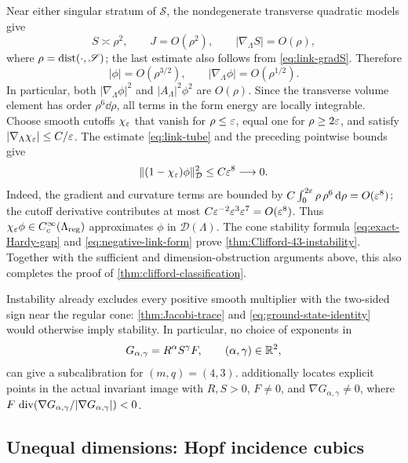 Near either singular stratum of $\mathscr S$, the nondegenerate transverse
quadratic models give
\[
 S\asymp\rho^2,
 \qquad
 J=O(\rho^2),
 \qquad
 |\nabla_\Lambda S|=O(\rho),
\]
where $\rho=\operatorname{dist}(\cdot,\mathscr S)$; the last estimate also follows from
\eqref{eq:link-gradS}.  Therefore
\[
 |\phi|=O(\rho^{3/2}),
 \qquad
 |\nabla_\Lambda\phi|=O(\rho^{1/2}).
\]
In particular, both $|\nabla_\Lambda\phi|^2$ and
$|A_\Lambda|^2\phi^2$ are $O(\rho)$.  Since the transverse volume
element has order $\rho^6\dd\rho$, all terms in the form energy are
locally integrable.  Choose smooth cutoffs \(\chi_\varepsilon\) that vanish
for \(\rho\leq\varepsilon\), equal one for \(\rho\geq2\varepsilon\), and satisfy
\(|\nabla_\Lambda\chi_\varepsilon|\leq C/\varepsilon\).
The estimate \eqref{eq:link-tube} and the preceding pointwise bounds give
\[
 \|(1-\chi_\varepsilon)\phi\|_{\mathcal D}^2
 \leq C\varepsilon^8\longrightarrow0.
\]
Indeed, the gradient and curvature terms are bounded by
\(C\int_0^{2\varepsilon}\rho\,\rho^6\,\mathrm d\rho=O(\varepsilon^8)\);
the cutoff derivative contributes at most
\(C\varepsilon^{-2}\varepsilon^3\varepsilon^7=O(\varepsilon^8)\).
Thus \(\chi_\varepsilon\phi\in C_c^\infty(\Lambda_{\mathrm{reg}})\) approximates
\(\phi\) in \(\mathcal D(\Lambda)\).
The cone stability formula \eqref{eq:exact-Hardy-gap} and
\eqref{eq:negative-link-form} prove
\cref{thm:Clifford-43-instability}.  Together with the sufficient and
dimension-obstruction arguments above, this also completes the proof
of \cref{thm:clifford-classification}.

\begin{remark}
\label{sec:obstruction}
\label{prop:Clifford-power-obstruction}
Instability already excludes every positive smooth multiplier with the
two-sided sign near the regular cone: \cref{thm:Jacobi-trace} and
\eqref{eq:ground-state-identity} would otherwise imply stability. In particular,
no choice of exponents in
\[
 G_{\alpha,\gamma}=R^\alpha S^\gamma F,
 \qquad(\alpha,\gamma)\in\mathbb R^2,
\]
can give a subcalibration for \((m,q)=(4,3)\).
 additionally locates explicit
points in the actual invariant image with \(R,S>0\), \(F\ne0\),
and \(\nabla G_{\alpha,\gamma}\ne0\), where
\(F\,\operatorname{div}(\nabla G_{\alpha,\gamma}/|\nabla G_{\alpha,\gamma}|)<0\).
\end{remark}

\subsection{Unequal dimensions: Hopf incidence cubics}

